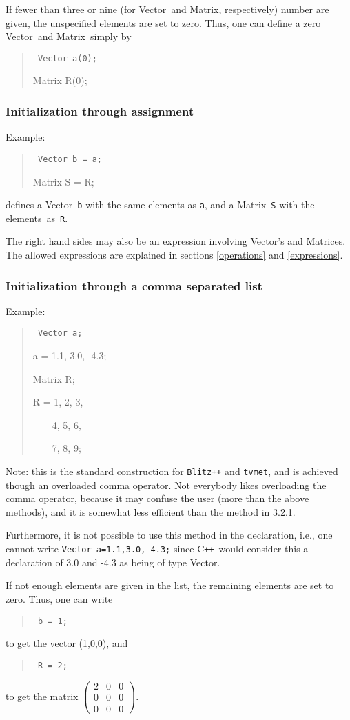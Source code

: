 \documentclass[12pt,twoside]{article}
\newcommand{\Vector}{{Vector}}
\newcommand{\Matrix}{{Matrix}}
\newcommand{\cxx}{C\texttt{++}}
\begin{document}
    If fewer than three or nine (for \Vector\ and \Matrix,
    respectively) number are given, the unspecified elements are set
    to zero. Thus, one can define a zero \Vector\ and \Matrix\ simply by
    \begin{quote}\tt
         Vector a(0);

         Matrix R(0);
    \end{quote}

  \subsubsection{Initialization through assignment}
  Example:
    \begin{quote}\tt
         Vector b = a;

         Matrix S = R;
    \end{quote}
    defines a \Vector\ \texttt b with the same elements as \texttt a,
    and a \Matrix\ \texttt S with the elements~as~\texttt R. 

    The right hand sides may also be an expression involving \Vector's
    and Matrices. The allowed expressions are explained in
    sections \ref{operations} and \ref{expressions}.
  \subsubsection{Initialization through a comma separated list}
  Example:
    \begin{quote}  \tt
         Vector a;

	 a = 1.1, 3.0, -4.3;

         Matrix R;

	 R = 1, 2, 3, 

     \ \ \ \ 4, 5, 6, 

     \ \ \ \ 7, 8, 9;
    \end{quote}  
    Note: this is the standard construction for \texttt{Blitz++} and
    \texttt{tvmet}, and is achieved though an overloaded comma
    operator. Not everybody likes overloading the comma operator,
    because it may confuse the user (more than the above methods), and
    it is somewhat less efficient than the method in 3.2.1.

    Furthermore, it is  not possible to use this method in
    the declaration, i.e., one cannot write \texttt{Vector
    a=1.1,3.0,-4.3;} since \cxx\ would consider this a
    declaration of 3.0 and -4.3 as being of type \Vector.
    
    If not enough elements are given in the list, the remaining
    elements are set to zero. Thus, one can write
    \begin{quote}\tt
         b = 1;
    \end{quote}
    to get the vector (1,0,0), and 
    \begin{quote}\tt
         R = 2;
    \end{quote}
    to get the matrix $\left(\begin{array}{ccc}2&0&0\\0&0&0\\0&0&0\end{array}\right)$.
\end{document}
